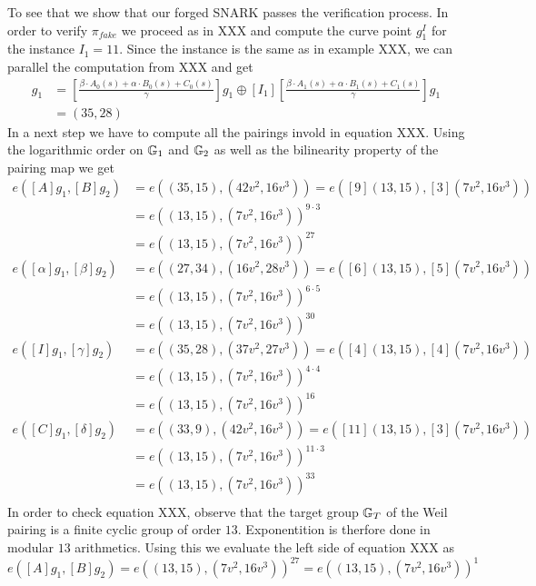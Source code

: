 \begin{example}
To see that we show that our forged SNARK passes the verification process. In order to verify $\pi_{fake}$ we proceed as in XXX and compute the curve point $g_1^I$ for the instance $I_1=11$. Since the instance is the same as in example XXX, we can parallel the computation from XXX and get
\begin{align*}
[I]g_1 & = [\frac{\beta\cdot A_{0}(s)+\alpha\cdot B_{0}(s)+C_{0}(s)}{\gamma}]g_1 \oplus [I_1][\frac{\beta\cdot A_{1}(s)+\alpha\cdot B_{1}(s)+C_{1}(s)}{\gamma}]g_1\\
       & = (35,28)
\end{align*} 
In a next step we have to compute all the pairings invold in equation XXX. Using the logarithmic order on $\mathbb{G}_1$ and $\mathbb{G}_2$ as well as the bilinearity property of the pairing map we get
\begin{align*}
e([A]g_1,[B]g_2) & = e((35,15),(42v^2,16v^3))
                   = e([9](13,15),[3](7v^2,16v^3))\\
               & = e((13,15),(7v^2,16v^3))^{9\cdot 3}\\ 
               & = e((13,15),(7v^2,16v^3))^{27}\\
e([\alpha]g_1,[\beta]g_2) & = e((27,34),(16v^2,28v^3)) 
                            = e([6](13,15),[5](7v^2,16v^3))\\
               & = e((13,15),(7v^2,16v^3))^{6\cdot 5}\\
               & = e((13,15),(7v^2,16v^3))^{30}\\   
e([I]g_1,[\gamma]g_2) & = e((35,28),(37v^2,27v^3)) 
                            = e([4](13,15),[4](7v^2,16v^3))\\
               & = e((13,15),(7v^2,16v^3))^{4\cdot 4}\\
               & = e((13,15),(7v^2,16v^3))^{16}\\ 
e([C]g_1,[\delta]g_2) & = e((33,9),(42v^2,16v^3)) 
                            = e([11](13,15),[3](7v^2,16v^3))\\
               & = e((13,15),(7v^2,16v^3))^{11\cdot 3}\\
               & = e((13,15),(7v^2,16v^3))^{33}\\                                             
\end{align*}  
In order to check equation XXX, observe that the target group $\mathbb{G}_T$ of the Weil pairing is a finite cyclic group of order $13$. Exponentition is therfore done in modular $13$ arithmetics. Using this we evaluate the left side of equation XXX as  
$$
e([A]g_1,[B]g_2) = e((13,15),(7v^2,16v^3))^{27} =e((13,15),(7v^2,16v^3))^{1}
$$
\end{example}
